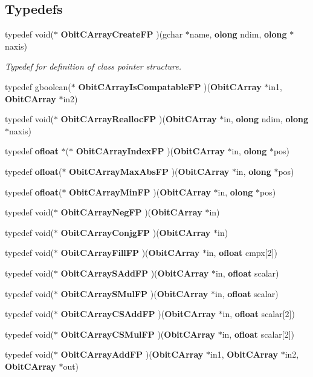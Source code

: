 \subsection*{Typedefs}
\begin{CompactItemize}
\item 
typedef void($\ast$ {\bf Obit\-CArray\-Create\-FP} )(gchar $\ast$name, {\bf olong} ndim, {\bf olong} $\ast$naxis)
\begin{CompactList}\small\item\em Typedef for definition of class pointer structure. \item\end{CompactList}\item 
typedef gboolean($\ast$ {\bf Obit\-CArray\-Is\-Compatable\-FP} )({\bf Obit\-CArray} $\ast$in1, {\bf Obit\-CArray} $\ast$in2)
\item 
typedef void($\ast$ {\bf Obit\-CArray\-Realloc\-FP} )({\bf Obit\-CArray} $\ast$in, {\bf olong} ndim, {\bf olong} $\ast$naxis)
\item 
typedef {\bf ofloat} $\ast$($\ast$ {\bf Obit\-CArray\-Index\-FP} )({\bf Obit\-CArray} $\ast$in, {\bf olong} $\ast$pos)
\item 
typedef {\bf ofloat}($\ast$ {\bf Obit\-CArray\-Max\-Abs\-FP} )({\bf Obit\-CArray} $\ast$in, {\bf olong} $\ast$pos)
\item 
typedef {\bf ofloat}($\ast$ {\bf Obit\-CArray\-Min\-FP} )({\bf Obit\-CArray} $\ast$in, {\bf olong} $\ast$pos)
\item 
typedef void($\ast$ {\bf Obit\-CArray\-Neg\-FP} )({\bf Obit\-CArray} $\ast$in)
\item 
typedef void($\ast$ {\bf Obit\-CArray\-Conjg\-FP} )({\bf Obit\-CArray} $\ast$in)
\item 
typedef void($\ast$ {\bf Obit\-CArray\-Fill\-FP} )({\bf Obit\-CArray} $\ast$in, {\bf ofloat} cmpx[2])
\item 
typedef void($\ast$ {\bf Obit\-CArray\-SAdd\-FP} )({\bf Obit\-CArray} $\ast$in, {\bf ofloat} scalar)
\item 
typedef void($\ast$ {\bf Obit\-CArray\-SMul\-FP} )({\bf Obit\-CArray} $\ast$in, {\bf ofloat} scalar)
\item 
typedef void($\ast$ {\bf Obit\-CArray\-CSAdd\-FP} )({\bf Obit\-CArray} $\ast$in, {\bf ofloat} scalar[2])
\item 
typedef void($\ast$ {\bf Obit\-CArray\-CSMul\-FP} )({\bf Obit\-CArray} $\ast$in, {\bf ofloat} scalar[2])
\item 
typedef void($\ast$ {\bf Obit\-CArray\-Add\-FP} )({\bf Obit\-CArray} $\ast$in1, {\bf Obit\-CArray} $\ast$in2, {\bf Obit\-CArray} $\ast$out)

\end{CompactItemize}
